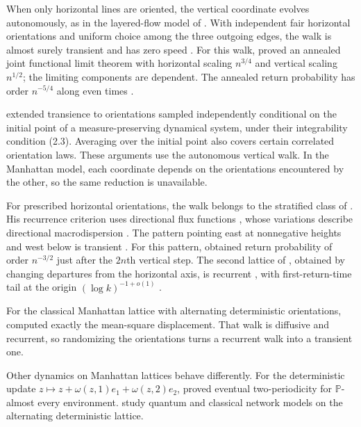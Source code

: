 \documentclass[11pt]{amsart}
\theoremstyle{plain}
\theoremstyle{definition}
\renewcommand{\P}{\mathbb P}
\newcommand{\1}{\mathbf 1}
\begin{document}
When only horizontal lines are oriented, the vertical coordinate evolves
autonomously, as in the layered-flow model of \citet*[p.~901]{MdM80}.
With independent fair horizontal orientations and uniform choice among
the three outgoing edges, the walk is almost surely transient
\citep*[Theorem~1.8]{CP03} and has zero speed
\citep*[Theorem~2.11]{CP04}.  For this walk,
\citet*[Theorem~2]{GLN08F} proved an annealed joint functional limit theorem
with horizontal scaling $n^{3/4}$ and vertical scaling $n^{1/2}$; the
limiting components are dependent.  The annealed return probability has
order $n^{-5/4}$ along even times
\citep*[Theorem~20 and Remark~21]{CGPS11}.

\citet*[Section~2.1, Theorem~1 and (2.3)]{GLN08T} extended transience to
orientations sampled independently conditional on the initial point of a
measure-preserving dynamical system, under their integrability condition
(2.3).  Averaging over the initial point also covers certain correlated
orientation laws.  These arguments use the autonomous vertical walk.
In the Manhattan model, each coordinate depends on the orientations
encountered by the other, so the same reduction is unavailable.

For prescribed horizontal orientations, the walk belongs to the stratified
class of \citet*[p.~752]{Bre17}.  His recurrence criterion uses directional
flux functions \citep*[Definition~2.3 and Theorem~2.4]{Bre17}, whose
variations describe directional macrodispersion \citep*[p.~753]{Bre17}.
The pattern pointing east at nonnegative heights and west below is
transient \citep*[Example~1.4 and Theorem~1.7]{CP03}.
For this pattern, \citet*[Theorem~1.2 and Corollary~2.6]{BHP22} obtained
return probability of order $n^{-3/2}$ just after the $2n$th vertical step.
The second lattice of \citet*[Section~1.1]{BHP22}, obtained by changing
departures from the horizontal axis, is recurrent
\citep*[Proposition~7.8]{Bre17}, with first-return-time tail at the origin
$(\log k)^{-1+o(1)}$ \citep*[Theorem~1.4]{BHP22}.

For the classical Manhattan lattice with alternating deterministic
orientations, \citet*[Theorem~1]{BH23} computed exactly the mean-square
displacement.  That walk is diffusive and recurrent, so randomizing the
orientations turns a recurrent walk into a transient one.

Other dynamics on Manhattan lattices behave differently.
For the deterministic update $z\mapsto z+\omega(z,1)e_1+\omega(z,2)e_2$,
\citet*[Theorem~1]{CHT19} proved eventual two-periodicity for
$\P$-almost every environment.
\citet*[pp.~10251--10254]{BOC03} study quantum and classical network models
on the alternating deterministic lattice.
\end{document}
